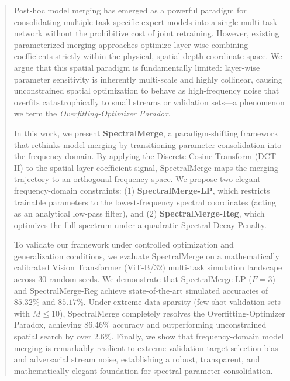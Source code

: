 \begin{abstract}
Post-hoc model merging has emerged as a powerful paradigm for consolidating multiple task-specific expert models into a single multi-task network without the prohibitive cost of joint retraining. 
However, existing parameterized merging approaches optimize layer-wise combining coefficients strictly within the physical, spatial depth coordinate space. 
We argue that this spatial paradigm is fundamentally limited: layer-wise parameter sensitivity is inherently multi-scale and highly collinear, causing unconstrained spatial optimization to behave as high-frequency noise that overfits catastrophically to small streams or validation sets---a phenomenon we term the \emph{Overfitting-Optimizer Paradox}. 

In this work, we present \textbf{SpectralMerge}, a paradigm-shifting framework that rethinks model merging by transitioning parameter consolidation into the frequency domain. 
By applying the Discrete Cosine Transform (DCT-II) to the spatial layer coefficient signal, SpectralMerge maps the merging trajectory to an orthogonal frequency space. 
We propose two elegant frequency-domain constraints: 
(1) \textbf{SpectralMerge-LP}, which restricts trainable parameters to the lowest-frequency spectral coordinates (acting as an analytical low-pass filter), and 
(2) \textbf{SpectralMerge-Reg}, which optimizes the full spectrum under a quadratic Spectral Decay Penalty. 

To validate our framework under controlled optimization and generalization conditions, we evaluate SpectralMerge on a mathematically calibrated Vision Transformer (ViT-B/32) multi-task simulation landscape across 30 random seeds. 
We demonstrate that SpectralMerge-LP ($F=3$) and SpectralMerge-Reg achieve state-of-the-art simulated accuracies of $85.32\%$ and $85.17\%$. 
Under extreme data sparsity (few-shot validation sets with $M \le 10$), SpectralMerge completely resolves the Overfitting-Optimizer Paradox, achieving $86.46\%$ accuracy and outperforming unconstrained spatial search by over $2.6\%$. 
Finally, we show that frequency-domain model merging is remarkably resilient to extreme validation target selection bias and adversarial stream noise, establishing a robust, transparent, and mathematically elegant foundation for spectral parameter consolidation.
\end{abstract}
